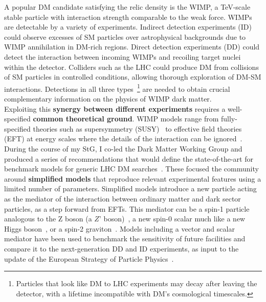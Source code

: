 A popular DM candidate satisfying the relic density is the WIMP, a TeV-scale stable particle with interaction strength comparable to the weak force.  
WIMPs are detectable by a variety of experiments. 
Indirect detection experiments (ID) could observe excesses of SM particles over astrophysical backgrounds due to WIMP annihilation in DM-rich regions. 
Direct detection experiments (DD) could detect the interaction between incoming WIMPs and recoiling target nuclei within the detector. 
Colliders such as the LHC could produce DM from collisions of SM particles in controlled conditions, allowing thorough exploration of DM-SM interactions. 
Detections in all three types~\footnote{Particles that look like DM to LHC experiments may decay after leaving the detector, with a lifetime incompatible with DM’s cosmological timescales.} are needed to obtain crucial complementary information on the physics of WIMP dark matter. 
\\
\indent 
Exploiting this \textbf{synergy between different experiments} requires a well-specified \textbf{common theoretical ground}. 
WIMP models range from fully-specified theories such as supersymmetry (SUSY)~\cite{Martin:1997ns} to effective field theories (EFT) at energy scales where the details of the interaction can be ignored~\cite{Goodman:2010ku}. 
During the course of my StG, I co-led the Dark Matter Working Group and produced a series of recommendations that would define the state-of-the-art for benchmark models for generic LHC DM searches~\cite{Abercrombie:2015wmb}. 
These focused the community around \textbf{simplified models} that reproduce relevant experimental features using a limited number of parameters. 
Simplified models introduce a new particle acting as the mediator of the interaction between ordinary matter and dark sector particles, as a step forward from EFTs. 
This mediator can be a spin-1 particle analogous to the Z boson (a $Z’$ boson)~\cite{Shoemaker:2011vi,Buchmueller:2013dya,Chala:2015ama}, a new spin-0 scalar much like a new Higgs boson~\cite{Buckley:2014fba,Egana-Ugrinovic:2019dqu,Abe:2018bpo}, or a spin-2 graviton~\cite{Kang:2020huh}. 
Models including a vector and scalar mediator have been used to benchmark the sensitivity of future facilities and compare it to the next-generation DD and ID experiments, as input to the update of the European Strategy of Particle Physics~\cite{Strategy:2019vxc}.
